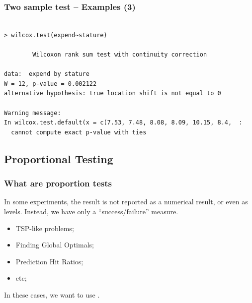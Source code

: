 \documentclass[10pt]{beamer}
\begin{document}
\begin{frame}
  \frametitle{Two sample test -- Examples (3)}
  {\small
\begin{verbatim}

> wilcox.test(expend~stature)                                                                              
                                                                                                           
        Wilcoxon rank sum test with continuity correction                                                  
                                                                                                           
data:  expend by stature                                                                                   
W = 12, p-value = 0.002122                                                                                 
alternative hypothesis: true location shift is not equal to 0                                              
                                                                                                           
Warning message:                                                                                           
In wilcox.test.default(x = c(7.53, 7.48, 8.08, 8.09, 10.15, 8.4,  :                                        
  cannot compute exact p-value with ties

\end{verbatim}
}
\end{frame}


\subsection{Proportional Testing}
\begin{frame}
  \frametitle{What are proportion tests}
  \begin{block}{}
    In some experiments, the result is not reported as a numerical
    result, or even as levels. Instead, we have only a
    ``success/failure'' measure.
  \end{block}
  \begin{itemize}
  \item TSP-like problems;
  \item Finding Global Optimals;
  \item Prediction Hit Ratios;
  \item etc;
  \end{itemize}
  \begin{block}{}
    In these cases, we want to use .
  \end{block}
\end{frame}
\end{document}
